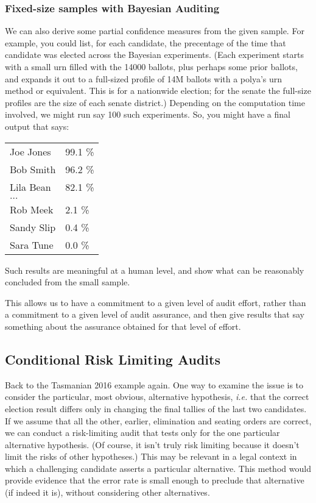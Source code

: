 \documentclass[10pt,a4paper]{article}
\begin{document}
\subsubsection{Fixed-size samples with Bayesian Auditing} 
We can also derive some partial confidence measures from the
given sample.  For example, you could list, for each candidate,
the precentage of the time that candidate was elected across the Bayesian
experiments.  (Each experiment starts with a small urn filled with
the 14000 ballots, plus perhaps some prior ballots, and expands
it out to a full-sized profile of 14M ballots with a polya's urn
method or equivalent.  This is for a nationwide election; for the
senate the full-size profiles are the size of each senate district.)
Depending on the computation time involved, we might run say
100 such experiments.  So, you might have a final output that says:

\begin{tabular}{ll}
Joe Jones    & 99.1 \% \\
Bob Smith    & 96.2 \% \\
Lila Bean      & 82.1 \% \\
$\ldots$    & \\
Rob Meek       & 2.1 \% \\ 
Sandy Slip      & 0.4 \%   \\
Sara Tune       & 0.0 \%   \\
\end{tabular}

Such results are meaningful at a human level, and show
what can be reasonably concluded from the small sample.

This allows us to have a commitment to a given
level of audit effort, rather than a commitment to a given level
of audit assurance, and then give results that say something about
the assurance obtained for that level of effort.


\subsection{Conditional Risk Limiting Audits}

Back to the Tasmanian 2016 example again. One way to examine the issue is to consider the particular, most obvious, alternative hypothesis, {\it i.e.} that the correct election result differs only in changing the final tallies of the last two candidates.  If we assume that all the other, earlier, elimination and seating orders are correct, we can conduct a risk-limiting audit that tests only for the one particular alternative hypothesis.  (Of course, it isn't truly risk limiting because it doesn't limit the risks of other hypotheses.) This may be relevant in a legal context in which a challenging candidate 
asserts a particular alternative. This method would provide evidence that the error rate is small enough to preclude that alternative (if indeed it is), without considering other alternatives.
\end{document}
